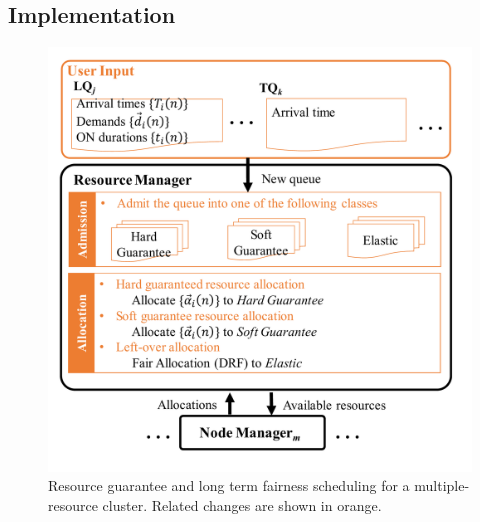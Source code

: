 \section{}

\subsection{Implementation}
\label{sec:impl}


\begin{figure}
\centering
\includegraphics[width=1.0\linewidth]{fig/diagram}
\caption{Resource guarantee and long term fairness scheduling for a multiple-resource cluster. Related changes are shown in orange. }
\label{fig:system_design}
\end{figure}

